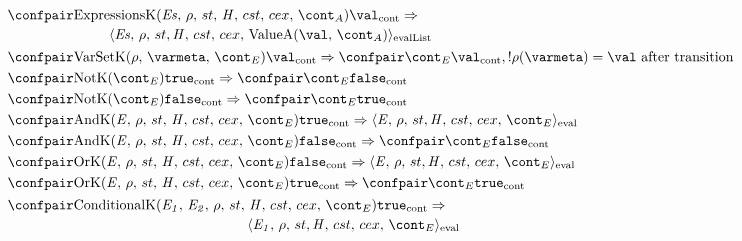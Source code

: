 \documentclass[a4paper,oneside]{article}
\newcommand{\cesktrans}[2]{\ensuremath{{#1} \Rightarrow {#2}}}
\newcommand{\cesktranssplit}[2]{\ensuremath{{#1} \Rightarrow\\ {#2}}}
\newcommand{\cesktranswhere}[3]{\ensuremath{{#1} \Rightarrow {#2}, {#3}}}
\begin{document}
\begin{figure}[Htp]
    \begin{eqfigure}
    \begin{align}
        &\begin{multlined}
        \cesktranssplit%
            {\contconf{\ExpressionsK{\exprs}{\env}{\acont}}{\val}}%
            {\evallistconf{\exprs}{\env}{\strace}{\cstrace}{\cex}{\ValueA{\val}{\acont}}}
        \end{multlined}
        \label{econtconf:exprs}\\
        &\cesktranswhere%
            {\contconf{\VarSetK{\env}{\varmeta}{\econt}}{\val}}%
            {\contconf{\econt}{\val}}%
            {\deref{\env(\varmeta)} = \val \text{ after transition}}
            \label{econtconf:varset}\\
        &\cesktrans%
            {\contconf{\NotK{\econt}}{\true}}%
            {\contconf{\econt}{\false}}
        \label{econtconf:not-true}\\
        &\cesktrans%
            {\contconf{\NotK{\econt}}{\false}}%
            {\contconf{\econt}{\true}}
        \label{econtconf:not-false}\\
        &\cesktrans%
            {\contconf{\AndK{\expressionmeta}{\env}{\econt}}{\true}}%
            {\evalconf{\expressionmeta}{\env}{\strace}{\cstrace}{\cex}{\econt}}
        \label{econtconf:and-true}\\
        &\cesktrans%
            {\contconf{\AndK{\expressionmeta}{\env}{\econt}}{\false}}%
            {\contconf{\econt}{\false}}
        \label{econtconf:and-false}\\
        &\cesktrans%
            {\contconf{\OrK{\expressionmeta}{\env}{\econt}}{\false}}%
            {\evalconf{\expressionmeta}{\env}{\strace}{\cstrace}{\cex}{\econt}}
        \label{econtconf:or-false}\\
        &\cesktrans%
            {\contconf{\OrK{\expressionmeta}{\env}{\econt}}{\true}}%
            {\contconf{\econt}{\true}}
        \label{econtconf:or-true}\\
        &\begin{multlined}
        \cesktranssplit%
            {\contconf{\ConditionalK{\expri{1}}{\expri{2}}{\env}{\econt}}{\true}}%
            {\evalconf{\expri{1}}{\env}{\strace}{\cstrace}{\cex}{\econt}}
        \end{multlined}
        \label{econtconf:cond-true}\\

\end{align}
\end{eqfigure}
\end{figure}
\end{document}
